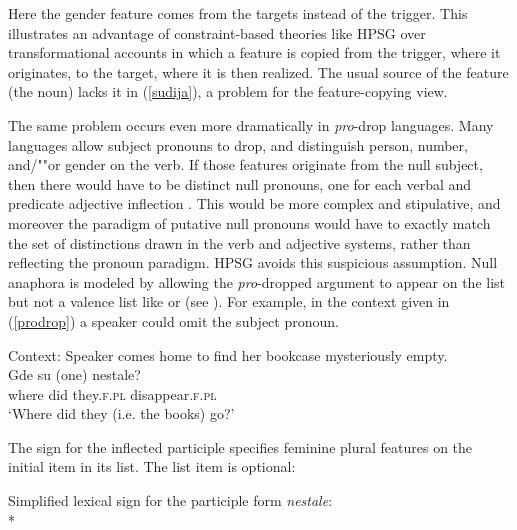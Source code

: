 \documentclass[output=paper
 	        ,biblatex
                ,babelshorthands
                ,newtxmath
                ,draftmode
                ,colorlinks, citecolor=brown
]{langscibook}
\begin{document}
\noindent 
Here the gender feature comes from the targets instead of the trigger.   This illustrates an advantage of constraint-based theories like HPSG over transformational accounts in which a feature is copied from the trigger, where it originates, to the target, where it is then realized.  The usual source of the feature (the noun) lacks it in (\ref{sudija}), a problem for the feature-copying view.   

The same problem occurs even more dramatically in \emph{pro}-drop languages.  Many languages
allow subject pronouns to drop, and distinguish person, number, and/""or gender on the verb.  If those
features originate from the null subject, then there would have to be distinct null pronouns, one
for each verbal and predicate adjective inflection \citep[64]{Pollard+Sag:1994}.  This would be more
complex and stipulative, and moreover the paradigm of putative null pronouns would have to exactly
match the set of distinctions drawn in the verb and adjective systems, rather than reflecting the
pronoun paradigm.    HPSG avoids this suspicious assumption.  Null anaphora is modeled by allowing
the \textit{pro}-dropped argument to appear on the \argst list but not a valence list like \subj or \comps (see ).  For example, in the context given in (\ref{prodrop}) a  speaker could omit the subject pronoun.  

\begin{exe}
\ex 
\label{prodrop}
Context: Speaker comes home to find her bookcase mysteriously empty. \\
\gll Gde   su  (one)                           nestale? \\
     where did \hphantom{(}they.\textsc{f.pl} disappear.\textsc{f.pl}     \\
\glt `Where did they (i.e. the books) go?' 
\end{exe}


\noindent
The sign for the inflected participle specifies feminine plural features on the initial item in its \argst list.  The \subj list item is optional: 

\begin{exe} 
\ex		\label{nestale} 
Simplified lexical sign for the participle form \textit{nestale}:\\*
\end{exe}
\end{document}
